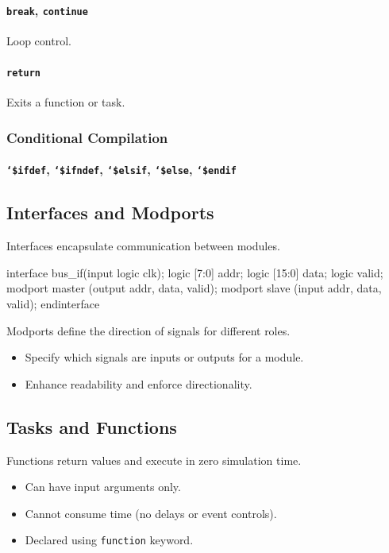 \paragraph{\texttt{break}, \texttt{continue}} Loop control.

\paragraph{\texttt{return}} Exits a function or task.

\subsubsection{Conditional Compilation}
\paragraph{\texttt{`\$ifdef}, \texttt{`\$ifndef}, \texttt{`\$elsif}, \texttt{`\$else}, \texttt{`\$endif}}

\subsection{Interfaces and Modports}

Interfaces encapsulate communication between modules.
\begin{verilogcode}
interface bus_if(input logic clk);
    logic [7:0] addr;
    logic [15:0] data;
    logic valid;
    modport master (output addr, data, valid);
    modport slave (input addr, data, valid);
endinterface
\end{verilogcode}

Modports define the direction of signals for different roles.

\begin{itemize}
    \item Specify which signals are inputs or outputs for a module.
    \item Enhance readability and enforce directionality.
\end{itemize}

\subsection{Tasks and Functions}
Functions return values and execute in zero simulation time.
\begin{itemize}
    \item Can have input arguments only.
    \item Cannot consume time (no delays or event controls).
    \item Declared using \texttt{function} keyword.
\end{itemize}

